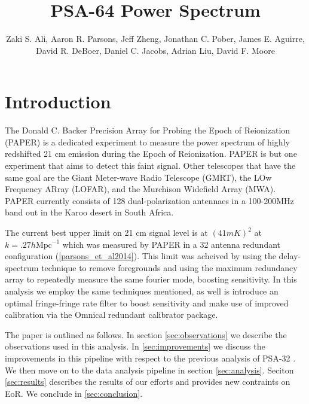 \documentclass[twocolumn,numberedappendix]{emulateapj}
\begin{document}
\title{PSA-64 Power Spectrum}

\author{
Zaki S. Ali,
Aaron R. Parsons,
Jeff Zheng,
Jonathan C. Pober,
James E. Aguirre,
David R. DeBoer,
Daniel C. Jacobs,
Adrian Liu,
David F. Moore
}


\begin{abstract}
\end{abstract}


\section{Introduction}
The Donald C. Backer Precision Array for Probing the Epoch of Reionization
(PAPER) is a dedicated experiment to measure the power spectrum of highly
redshifted 21 cm emission during the Epoch of Reionization. PAPER is but one
experiment that aims to detect this faint signal. Other telescopes that have the
same goal are the Giant Meter-wave Radio Telescope (GMRT), the LOw Frequency
ARray (LOFAR), and the Murchison Widefield Array (MWA). PAPER currently consists
of 128 dual-polarization antennaes in a 100-200MHz band out in the Karoo desert
in South Africa. 

The current best upper limit on 21 cm signal level is at $(41 mK)^{2}$ at
$k=.27 h \text{Mpc}^{-1}$ which was measured by PAPER in a 32 antenna redundant
configuration (\ref{parsons_et_al2014}). This limit was acheived by using the
delay-spectrum technique to remove foregrounds and using the  maximum
redundancy array to repeatedly measure the same fourier mode, boosting
sensitivity. In this analysis we employ the same techniques mentioned, as well
is introduce an optimal fringe-fringe rate filter to  boost sensitivity and
make use of improved calibration via the Omnical redundant calibrator package. 

The paper is outlined as follows. In section \ref{sec:observations} we describe
the observations used in this analysis. In \ref{sec:improvements} we discuss the
improvements in this pipeline with respect to the previous analysis of PSA-32
\cite{parsons_et_al2014}. We then move on to the data analysis pipeline in
section \ref{sec:analysis}. Seciton \ref{sec:results} describes the results of
 our efforts and provides new contraints on EoR. We conclude in
\ref{sec:conclusion}.
\end{document}
